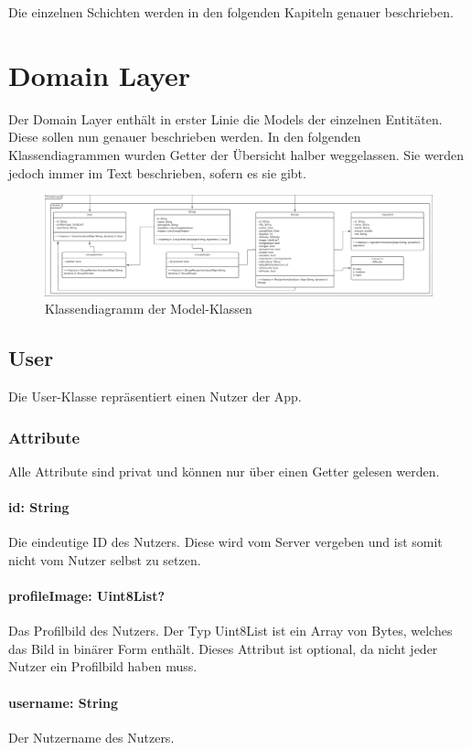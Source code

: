 \documentclass[parskip=full]{scrartcl}
\newcommand{\changelocaltocdepth}[1]{%
  \addtocontents{toc}{\protect\setcounter{tocdepth}{#1}}%
  \setcounter{tocdepth}{#1}%
}
\begin{document}
Die einzelnen Schichten werden in den folgenden Kapiteln genauer beschrieben.

\newpage

\changelocaltocdepth{2}

\section{Domain Layer}
Der Domain Layer enthält in erster Linie die Models der einzelnen Entitäten. Diese sollen nun genauer beschrieben werden. In den folgenden Klassendiagrammen wurden Getter der Übersicht halber weggelassen. Sie werden jedoch immer im Text beschrieben, sofern es sie gibt.
\begin{figure}[htp]
    \centering
    \includegraphics[width = \textwidth]{images/domainLayer/domainLayer.pdf}
    \caption{Klassendiagramm der Model-Klassen}
    \label{fig:domain-layer}
\end{figure}

\subsection{User}
Die User-Klasse repräsentiert einen Nutzer der App.
\subsubsection{Attribute}
Alle Attribute sind privat und können nur über einen Getter gelesen werden.
\paragraph{id: String}
Die eindeutige ID des Nutzers. Diese wird vom Server vergeben und ist somit nicht vom Nutzer selbst zu setzen.
\paragraph{profileImage: Uint8List?}
Das Profilbild des Nutzers. Der Typ Uint8List ist ein Array von Bytes, welches das Bild in binärer Form enthält. Dieses Attribut ist optional, da nicht jeder Nutzer ein Profilbild haben muss.
\paragraph{username: String}
Der Nutzername des Nutzers.
\end{document}
